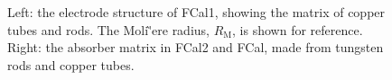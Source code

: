 \begin{figure}
	\centering
	\caption{Left: the electrode structure of FCal1, showing the matrix of copper tubes and rods. The Moli{\`'e}re radius, $R_{\mathrm{M}}$, is shown for reference. Right: the absorber matrix in FCal2 and FCal, made from tungsten rods and copper tubes.}
	\label{fig:ATLAS-calorimeter-fcal-electrodes}
\end{figure}


